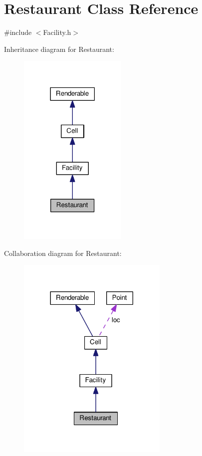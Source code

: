 \hypertarget{classRestaurant}{}\section{Restaurant Class Reference}
\label{classRestaurant}


{\ttfamily \#include $<$Facility.\+h$>$}



Inheritance diagram for Restaurant\+:
\nopagebreak
\begin{figure}[H]
\begin{center}
\leavevmode
\includegraphics[width=146pt]{classRestaurant__inherit__graph}
\end{center}
\end{figure}


Collaboration diagram for Restaurant\+:
\nopagebreak
\begin{figure}[H]
\begin{center}
\leavevmode
\includegraphics[width=204pt]{classRestaurant__coll__graph}
\end{center}
\end{figure}
